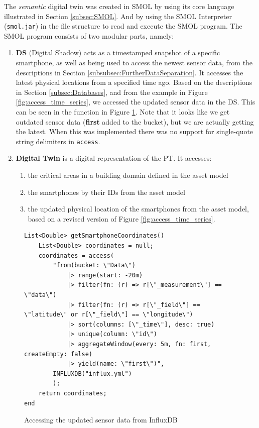 \documentclass{article}
\begin{document}
The \emph{semantic} digital twin was created in SMOL by using its core language illustrated in Section \ref{subsec:SMOL}. And by using the SMOL Interpreter (\verb|smol.jar|) in the file structure to read and execute the SMOL program. The SMOL program consists of two modular parts, namely: 
\begin{enumerate}
    \item \textbf{DS} (Digital Shadow) acts as a timestamped snapshot of a specific smartphone, as well as being used to access the newest sensor data, from the descriptions in Section \ref{subsubsec:FurtherDataSeparation}. It accesses the latest physical locations from a specified time ago. Based on the descriptions in Section \ref{subsec:Databases}, and from the example in Figure \ref{fig:access_time_series}, we accessed the updated sensor data in the DS. This can be seen in the function in Figure \ref{fig:DigitalShadowInflux}. Note that it looks like we get outdated sensor data (\textbf{first} added to the bucket), but we are actually getting the latest. When this was implemented there was no support for single-quote string delimiters in \verb|access|.
    \item \textbf{Digital Twin} is a digital representation of the PT. It accesses: 
    \begin{enumerate}
        \item the critical areas in a building domain defined in the asset model
        \item the smartphones by their IDs from the asset model
        \item the updated physical location of the smartphones from the asset model, based on a revised version of Figure \ref{fig:access_time_series}.
    \end{enumerate}
\end{enumerate}

\begin{figure}[H]
    \centering
    \begin{small}
    \begin{verbatim}
List<Double> getSmartphoneCoordinates()
    List<Double> coordinates = null;
    coordinates = access(
        "from(bucket: \"Data\")
            |> range(start: -20m)
            |> filter(fn: (r) => r[\"_measurement\"] == \"data\")
            |> filter(fn: (r) => r[\"_field\"] == \"latitude\" or r[\"_field\"] == \"longitude\")
            |> sort(columns: [\"_time\"], desc: true)
            |> unique(column: \"id\")
            |> aggregateWindow(every: 5m, fn: first, createEmpty: false)
            |> yield(name: \"first\")",
        INFLUXDB("influx.yml")
        );
    return coordinates;
end
    \end{verbatim}
    \end{small}
    \caption{Accessing the updated sensor data from InfluxDB}
    \label{fig:DigitalShadowInflux}
\end{figure}
\end{document}
